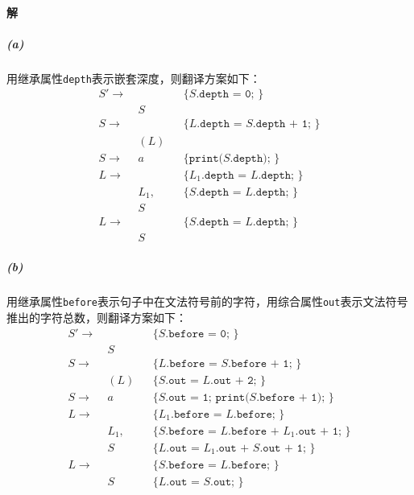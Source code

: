 \documentclass{article}
\begin{document}
\paragraph{解}
\subparagraph{(a)}
用继承属性\texttt{depth}表示嵌套深度，则翻译方案如下：
\begin{align*}
    S' \rightarrow\ & &&\texttt{\{ }S\texttt{.depth = 0; \}}\\
                     &S&& \\
    S \rightarrow\ & &&\texttt{\{ }L\texttt{.depth = }S\texttt{.depth + 1; \}}\\
                    &(L)&& \\
    S \rightarrow\  &a&& \texttt{\{ print(}S\texttt{.depth); \}}\\
    L \rightarrow\ & &&\texttt{\{ }L_1\texttt{.depth = }L\texttt{.depth; \}}\\
                    &L_1,&& \texttt{\{ }S\texttt{.depth = }L\texttt{.depth; \}}\\
                    &S&& \\
    L \rightarrow\ & &&\texttt{\{ }S\texttt{.depth = }L\texttt{.depth; \}}\\
                    &S&&
\end{align*}
\subparagraph{(b)}
用继承属性\texttt{before}表示句子中在文法符号前的字符，用综合属性\texttt{out}表示文法符号推出的字符总数，则翻译方案如下：
\begin{align*}
    S' \rightarrow\ & && \texttt{\{ }S\texttt{.before = 0; \}}\\
                    &S&& \\
    S \rightarrow\ & &&\texttt{\{ }L\texttt{.before = }S\texttt{.before + 1; \}}\\
                    &(L)&& \texttt{\{ }S\texttt{.out = }L\texttt{.out + 2; \}} \\
    S \rightarrow\ &a&& \texttt{\{ }S\texttt{.out = 1; print(}S\texttt{.before + 1); \}}\\
    L \rightarrow\ & && \texttt{\{ }L_1\texttt{.before = }L\texttt{.before; \}}\\
                    &L_1,&& \texttt{\{ }S\texttt{.before = }L\texttt{.before + }L_1\texttt{.out + 1; \}}\\
                    &S&& \texttt{\{ }L\texttt{.out = }L_1\texttt{.out + }S\texttt{.out + 1; \}} \\
    L \rightarrow\ & &&\texttt{\{ }S\texttt{.before = }L\texttt{.before; \}}\\
                    &S&& \texttt{\{ }L\texttt{.out = }S\texttt{.out; \}}
\end{align*}
\\
\end{document}
